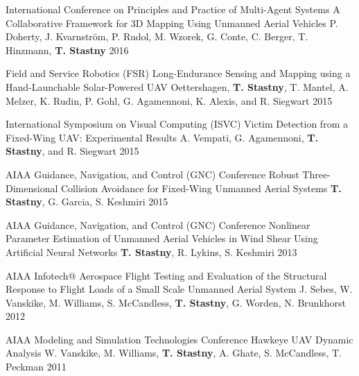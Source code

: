 \begin{cventries}
\cvpubentry
	{International Conference on Principles and Practice of Multi-Agent Systems} %
	{A Collaborative Framework for 3D Mapping Using Unmanned Aerial Vehicles} %
	{P. Doherty, J. Kvarnstr{\"o}m, P. Rudol, M. Wzorek, G. Conte, C. Berger, T. Hinzmann, \textbf{T. Stastny}} %
	{} %
	{2016} %
	{} %
	{} %

\cvpubentry
	{Field and Service Robotics (FSR)} %
	{Long-Endurance Sensing and Mapping using a Hand-Launchable Solar-Powered UAV} %
	{Oettershagen, \textbf{T. Stastny}, T. Mantel, A. Melzer, K. Rudin, P. Gohl, G. Agamennoni, K. Alexis, and R. Siegwart} %
	{} %
	{2015} %
	{} %
	{} %

\cvpubentry
	{International Symposium on Visual Computing (ISVC)} %
	{Victim Detection from a Fixed-Wing UAV: Experimental Results} %
	{A. Vempati, G. Agamennoni, \textbf{T. Stastny}, and R. Siegwart} %
	{} %
	{2015} %
	{} %
	{} %
	
\cvpubentry
	{AIAA Guidance, Navigation, and Control (GNC) Conference} %
	{Robust Three-Dimensional Collision Avoidance for Fixed-Wing Unmanned Aerial Systems} %
	{\textbf{T. Stastny}, G. Garcia, S. Keshmiri} %
	{} %
	{2015} %
	{} %
	{} %
	
\cvpubentry
	{AIAA Guidance, Navigation, and Control (GNC) Conference} %
	{Nonlinear Parameter Estimation of Unmanned Aerial Vehicles in Wind Shear Using Artificial Neural Networks} %
	{\textbf{T. Stastny}, R. Lykins, S. Keshmiri} %
	{} %
	{2013} %
	{} %
	{} %
		
\cvpubentry
	{AIAA Infotech@ Aerospace} %
	{Flight Testing and Evaluation of the Structural Response to Flight Loads of a Small Scale Unmanned Aerial System} %
	{J. Sebes, W. Vanskike, M. Williams, S. McCandless, \textbf{T. Stastny}, G. Worden, N. Brunkhorst} %
	{} %
	{2012} %
	{} %
	{} %

\cvpubentry
	{AIAA Modeling and Simulation Technologies Conference} %
	{Hawkeye UAV Dynamic Analysis} %
	{W. Vanskike, M. Williams, \textbf{T. Stastny}, A. Ghate, S. McCandless, T. Peckman} %
	{} %
	{2011} %
	{} %
	{} %



\end{cventries}
